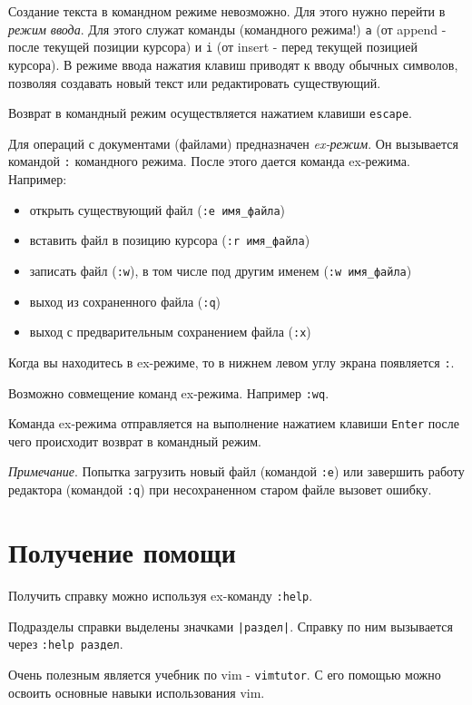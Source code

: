 Создание текста в командном режиме невозможно. Для этого нужно перейти в \emph{режим ввода}. Для этого служат команды (командного режима!) \verb+a+ (от append - после текущей позиции курсора)  и \verb+i+ (от insert - перед текущей позицией курсора). В режиме ввода нажатия клавиш приводят к вводу обычных символов, позволяя создавать новый текст или редактировать существующий.

Возврат в командный режим осуществляется нажатием клавиши \verb+escape+.

Для операций с документами (файлами) предназначен \emph{ex-режим}. Он вызывается командой \verb+:+ командного режима. После этого дается команда ex-режима. Например:
\begin{itemize}
\item открыть существующий файл (\verb+:e имя_файла+) 
\item вставить файл в позицию курсора (\verb+:r имя_файла+)
\item записать файл (\verb+:w+), в том числе под другим именем (\verb+:w имя_файла+)
\item выход из сохраненного файла (\verb+:q+)\label{viexit}
\item выход с предварительным сохранением файла (\verb+:x+)
\end{itemize}

Когда вы находитесь в ex-режиме, то в нижнем левом углу экрана появляется \verb+:+.

Возможно совмещение команд ex-режима. Например \verb+:wq+. 

Команда ex-режима отправляется на выполнение нажатием клавиши \verb+Enter+ после чего происходит возврат в командный режим.

\emph{Примечание}. Попытка загрузить новый файл (командой \verb+:e+) или завершить работу редактора (командой \verb+:q+) при несохраненном старом файле вызовет ошибку.

\section{Получение помощи}

Получить справку можно используя ex-команду \verb+:help+.

Подразделы справки выделены значками \verb+|раздел|+. Справку по ним вызывается через \verb+:help раздел+.

Очень полезным является учебник по vim - \verb+vimtutor+. С его помощью можно освоить основные навыки использования vim.

